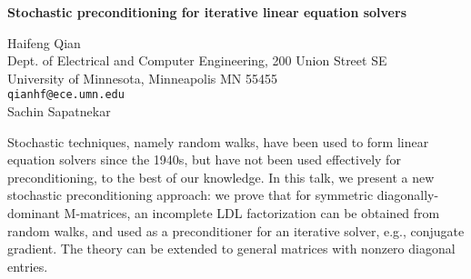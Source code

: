 \documentclass{report}
\begin{document}

\begin{center}
{\large
{\bf Stochastic preconditioning for iterative linear equation solvers}}

	Haifeng Qian \\
	Dept. of Electrical and Computer Engineering, 200 Union Street SE \\
	University of Minnesota, Minneapolis MN 55455 \\
	{\tt qianhf@ece.umn.edu} \\
	Sachin Sapatnekar
\end{center}
Stochastic techniques, namely random walks, have been used
to form linear equation solvers since the 1940s, but have
not been used effectively for preconditioning, to the best
of our knowledge. In this talk, we present a new stochastic
preconditioning approach: we prove that for symmetric
diagonally-dominant M-matrices, an incomplete LDL
factorization can be obtained from random walks, and used as
a preconditioner for an iterative solver, e.g., conjugate
gradient. The theory can be extended to general matrices
with nonzero diagonal entries.
\end{document}
